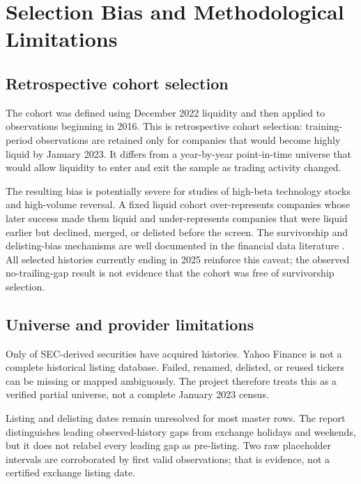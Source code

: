 \section{Selection Bias and Methodological Limitations}

\subsection{Retrospective cohort selection}

The cohort was defined using December 2022 liquidity and then applied to
observations beginning in 2016. This is retrospective cohort selection:
training-period observations are retained only for companies that would become
highly liquid by January 2023. It differs from a year-by-year point-in-time
universe that would allow liquidity to enter and exit the sample as trading
activity changed.

The resulting bias is potentially severe for studies of high-beta technology
stocks and high-volume reversal. A fixed liquid cohort over-represents
companies whose later success made them liquid and under-represents companies
that were liquid earlier but declined, merged, or delisted before the screen.
The survivorship and delisting-bias mechanisms are well documented in the
financial data literature \citep{brown1992survivorship,shumway1997delisting}.
All selected histories currently ending in 2025 reinforce this caveat; the
observed no-trailing-gap result is not evidence that the cohort was free of
survivorship selection.

\subsection{Universe and provider limitations}

Only \AcquiredSecurities{} of \UniverseSecurities{} SEC-derived securities
have acquired histories. Yahoo Finance is not a complete historical listing
database. Failed, renamed, delisted, or reused tickers can be missing or mapped
ambiguously. The project therefore treats this as a verified partial universe,
not a complete January 2023 census.

Listing and delisting dates remain unresolved for most master rows. The report
distinguishes leading observed-history gaps from exchange holidays and
weekends, but it does not relabel every leading gap as pre-listing. Two raw
placeholder intervals are corroborated by first valid observations; that is
evidence, not a certified exchange listing date.

